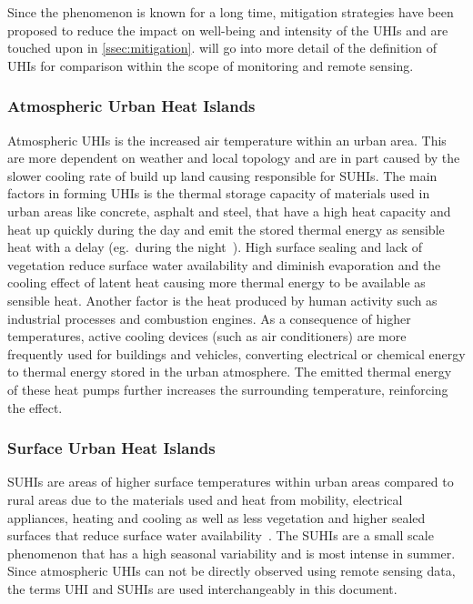 \documentclass[12pt,a4paper, english,twoside]{article}
\begin{document}
    
    Since the phenomenon is known for a long time, mitigation strategies have been proposed to reduce the impact on well-being and intensity of the \glspl{UHI} and are touched upon in \cref{ssec:mitigation}.
     will go into more detail of the definition of \glspl{UHI} for comparison within the scope of monitoring and remote sensing. 
%
    \subsubsection{Atmospheric Urban Heat Islands}\label{sec:at_uhi}
      Atmospheric \glspl{UHI} is the increased air temperature within an urban area. 
      This are more dependent on weather and local topology and are in part caused by the slower cooling rate of build up land causing responsible for \glspl{SUHI}.
      The main factors in forming \glspl{UHI} is the thermal storage capacity of materials used in urban areas like concrete, asphalt and steel, that have a high heat capacity and heat up quickly during the day and emit the stored thermal energy as sensible heat with a delay (eg.~during the night~\autocite{Ramamurthy2014}).
      High surface sealing and lack of vegetation reduce surface water availability and diminish evaporation and the cooling effect of latent heat causing more thermal energy to be available as sensible heat. 
      Another factor is the heat produced by human activity such as industrial processes and combustion engines.
      As a consequence of higher temperatures, active cooling devices (such as air conditioners) are more frequently used for buildings and vehicles, converting electrical or chemical energy to thermal energy stored in the urban atmosphere. 
      The emitted thermal energy of these heat pumps further increases the surrounding temperature, reinforcing the effect.
      \\
      
    \subsubsection{Surface Urban Heat Islands}\label{sec:suhi}
       \glspl{SUHI} are areas of higher surface temperatures within urban areas compared to rural areas due to the materials used and heat from mobility, electrical appliances, heating and cooling as well as less vegetation and higher sealed surfaces that reduce surface water availability~\autocite[pp. 7--12]{EPA2008}. 
       The \glspl{SUHI} are a small scale phenomenon that has a high seasonal variability and is most intense in summer.
       Since atmospheric \glspl{UHI} can not be directly observed using remote sensing data, the terms \gls{UHI} and \glspl{SUHI} are used interchangeably in this document. 
    \newpage
\end{document}
